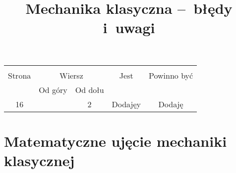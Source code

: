 \documentclass[a4paper,11pt]{article}
\title{Mechanika klasyczna --~błędy i~uwagi}
\begin{document}



\maketitle %




\vspace{\spaceThree}



\begin{center}
  \begin{tabular}{|c|c|c|c|c|}
    \hline
    & \multicolumn{2}{c|}{} & & \\
    Strona & \multicolumn{2}{c|}{Wiersz} & Jest
                              & Powinno być \\ \cline{2-3}
    & Od góry & Od dołu & & \\
    \hline
    16  & &  2 & Dodajęy & Dodaję \\
    \hline
  \end{tabular}
\end{center}

\vspace{\spaceTwo}





\newpage
\section{Matematyczne ujęcie mechaniki klasycznej}

\vspace{\spaceTwo}
\end{document}
